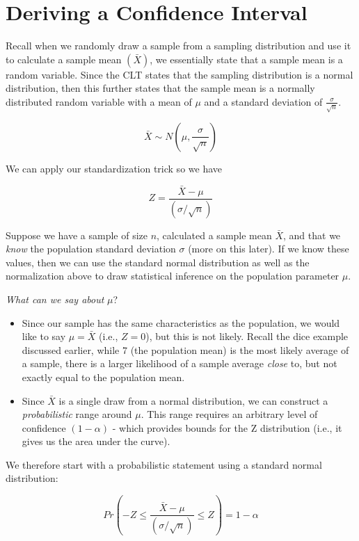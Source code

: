 \documentclass[
]{book}
\begin{document}
\hypertarget{deriving-a-confidence-interval}{%
\section{Deriving a Confidence Interval}\label{deriving-a-confidence-interval}}

Recall when we randomly draw a sample from a sampling distribution and use it to calculate a sample mean \((\bar{X})\), we essentially state that a sample mean is a random variable. Since the CLT states that the sampling distribution is a normal distribution, then this further states that the sample mean is a normally distributed random variable with a mean of \(\mu\) and a standard deviation of \(\frac{\sigma}{\sqrt{n}}\).

\[\bar{X} \sim N\left(\mu,\frac{\sigma}{\sqrt{n}}\right)\]

We can apply our standardization trick so we have

\[Z=\frac{\bar{X}-\mu}{(\sigma/\sqrt{n})}\]

Suppose we have a sample of size \(n\), calculated a sample mean \(\bar{X}\), and that we \emph{know} the population standard deviation \(\sigma\) (more on this later). If we know these values, then we can use the standard normal distribution as well as the normalization above to draw statistical inference on the population parameter \(\mu\).

\emph{What can we say about} \(\mu\)?

\begin{itemize}
\item
  Since our sample has the same characteristics as the population, we would like to say \(\mu = \bar{X}\) (i.e., \(Z=0\)), but this is not likely. Recall the dice example discussed earlier, while 7 (the population mean) is the most likely average of a sample, there is a larger likelihood of a sample average \emph{close} to, but not exactly equal to the population mean.
\item
  Since \(\bar{X}\) is a single draw from a normal distribution, we can construct a \emph{probabilistic} range around \(\mu\). This range requires an arbitrary level of confidence \((1-\alpha)\) - which provides bounds for the Z distribution (i.e., it gives us the area under the curve).
\end{itemize}

We therefore start with a probabilistic statement using a standard normal distribution:

\[Pr\left(-Z \leq \frac{\bar{X}-\mu}{(\sigma/\sqrt{n})} \leq Z\right)=1-\alpha\]
\end{document}
